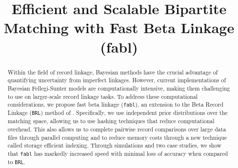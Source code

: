 \documentclass[ba]{imsart}
\begin{document}
\linenumbers
\begin{frontmatter}
\title{Efficient and Scalable Bipartite Matching with Fast Beta Linkage  (fabl)}


\begin{abstract}
Within the field of record linkage, Bayesian methods have the crucial advantage of quantifying uncertainty from imperfect linkages. However, current implementations of Bayesian Fellegi-Sunter models are computationally intensive, making them challenging to use on larger-scale record linkage tasks. To address these computational considerations, we propose fast beta linkage (\texttt{fabl}), an extension to the Beta Record Linkage (\texttt{BRL}) method of \cite{sadinle_bayesian_2017}. Specifically, we use independent prior distributions over the matching space, allowing us to use hashing techniques that reduce computational overhead. This also allows us to complete pairwise record comparisons over large data files through parallel computing and to reduce memory costs through a new technique called storage efficient indexing. Through simulations and two case studies, we show that \texttt{fabl} has markedly increased speed with minimal loss of accuracy when compared to \texttt{BRL}.
%


\end{abstract}
\end{frontmatter}
\end{document}
